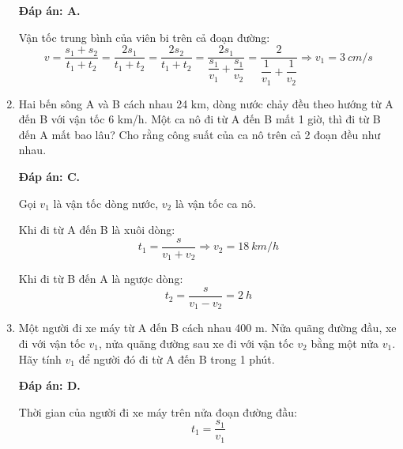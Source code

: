 \begin{enumerate}[label=\bfseries Câu \arabic*:]
{	}
	
	\loigiai
	{\textbf{Đáp án: A.}
		
			Vận tốc trung bình của viên bi trên cả đoạn đường:
		$$v=\dfrac{s_1+s_2}{t_1+t_2} = \dfrac{2s_1}{t_1+t_2} = \dfrac{2s_2}{t_1+t_2} = \dfrac{2s_1}{\dfrac{s_1}{v_1}+\dfrac{s_1}{v_2}} = \dfrac{2}{\dfrac{1}{v_1}+\dfrac{1}{v_2}} \Rightarrow v_1 = \SI{3}{cm/s}$$
	}
	\item {}
	
	\cauhoi
	{Hai bến sông A và B cách nhau 24 km, dòng nước chảy đều theo hướng từ A đến B với vận tốc 6 km/h. Một ca nô đi từ A đến B mất 1 giờ, thì đi từ B đến A mất bao lâu? Cho rằng công suất của ca nô trên cả 2 đoạn đều như nhau.
		
		
	}
	
	\loigiai
	{\textbf{Đáp án: C.}
		
	Gọi $v_1$ là vận tốc dòng nước, $v_2$ là vận tốc ca nô.
	
	Khi đi từ A đến B là xuôi dòng:
	$$t_1 = \dfrac{s}{v_1+v_2} \Rightarrow v_2=\SI{18}{km/h}$$
	
	Khi đi từ B đến A là ngược dòng:
	$$t_2=\dfrac{s}{v_1-v_2} = \SI{2}{h}$$
	}
	\item {}
	
	\cauhoi
	{Một người đi xe máy từ A đến B cách nhau 400 m. Nửa quãng đường đầu, xe đi với vận tốc $v_1$, nửa quãng đường sau xe đi với vận tốc $v_2$ bằng một nửa $v_1$. Hãy tính $v_1$ để người đó đi từ A đến B trong 1 phút.
		
		
	}
	
	\loigiai
	{\textbf{Đáp án: D.}
		
	Thời gian của người đi xe máy trên nửa đoạn đường đầu:
	$$t_1 = \dfrac{s_1}{v_1}$$
	
}
\end{enumerate}
